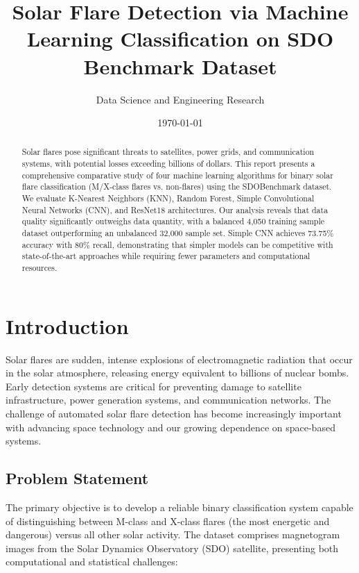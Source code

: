 \documentclass[11pt,a4paper]{article}
\title{\textbf{Solar Flare Detection via Machine Learning Classification on SDO Benchmark Dataset}}
\author{Data Science and Engineering Research}
\date{\today}
\begin{document}
\maketitle

\begin{abstract}
Solar flares pose significant threats to satellites, power grids, and communication systems, with potential losses exceeding billions of dollars. This report presents a comprehensive comparative study of four machine learning algorithms for binary solar flare classification (M/X-class flares vs. non-flares) using the SDOBenchmark dataset. We evaluate K-Nearest Neighbors (KNN), Random Forest, Simple Convolutional Neural Networks (CNN), and ResNet18 architectures. Our analysis reveals that data quality significantly outweighs data quantity, with a balanced 4,050 training sample dataset outperforming an unbalanced 32,000 sample set. Simple CNN achieves 73.75\% accuracy with 80\% recall, demonstrating that simpler models can be competitive with state-of-the-art approaches while requiring fewer parameters and computational resources.
\end{abstract}

\section{Introduction}

Solar flares are sudden, intense explosions of electromagnetic radiation that occur in the solar atmosphere, releasing energy equivalent to billions of nuclear bombs. Early detection systems are critical for preventing damage to satellite infrastructure, power generation systems, and communication networks. The challenge of automated solar flare detection has become increasingly important with advancing space technology and our growing dependence on space-based systems.

\subsection{Problem Statement}

The primary objective is to develop a reliable binary classification system capable of distinguishing between M-class and X-class flares (the most energetic and dangerous) versus all other solar activity. The dataset comprises magnetogram images from the Solar Dynamics Observatory (SDO) satellite, presenting both computational and statistical challenges:
\end{document}
